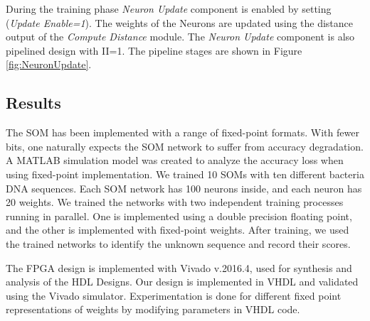 \documentclass[a4paper,10pt]{article}
\begin{document}
During the training phase \textit{Neuron Update} component is enabled by setting (\textit{Update Enable=1}). The weights of the Neurons are updated using the distance output of the \textit{Compute Distance} module. The \textit{Neuron Update} component is also pipelined design with II=1. The pipeline stages are shown in Figure \ref{fig:NeuronUpdate}.
\subsection{Results}
The SOM has been implemented with a range of fixed-point formats. With fewer bits, one naturally expects the SOM network to suffer from accuracy degradation. A MATLAB simulation model was created to analyze the accuracy loss when using fixed-point implementation. We trained 10 SOMs with ten different bacteria DNA sequences. Each SOM network has 100 neurons inside, and each neuron has 20 weights. We trained the networks with two independent training processes running in parallel. One is implemented using a double precision floating point, and the other is implemented with fixed-point weights. After training, we used the trained networks to identify the unknown sequence and record their scores.

The FPGA design is implemented with Vivado v.2016.4, used for synthesis and analysis of the HDL Designs. Our design is implemented in VHDL and validated using the Vivado simulator. Experimentation is done for different fixed point representations of weights by modifying parameters in VHDL code. 
\end{document}
